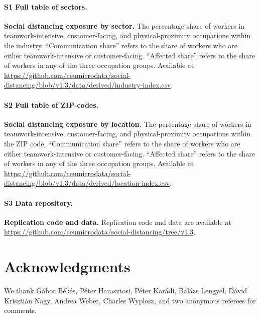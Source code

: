 \paragraph*{S1 Full table of sectors.}
\label{S1_File}
{\bf Social distancing exposure by sector.} The percentage share of workers in teamwork-intensive, customer-facing, and physical-proximity occupations within the industry. ``Communication share'' refers to the share of workers who are either teamwork-intensive or customer-facing. ``Affected share'' refers to the share of workers in any of the three occupation groups. Available at \url{https://github.com/ceumicrodata/social-distancing/blob/v1.3/data/derived/industry-index.csv}.

\paragraph*{S2 Full table of ZIP-codes.}
\label{S2_File}
{\bf Social distancing exposure by location.} The percentage share of workers in teamwork-intensive, customer-facing, and physical-proximity occupations within the ZIP code. ``Communication share'' refers to the share of workers who are either teamwork-intensive or customer-facing. ``Affected share'' refers to the share of workers in any of the three occupation groups. Available at \url{https://github.com/ceumicrodata/social-distancing/blob/v1.3/data/derived/location-index.csv}.

\paragraph*{S3 Data repository.}
\label{S3_URL}
{\bf Replication code and data.} Replication code and data are available at \url{https://github.com/ceumicrodata/social-distancing/tree/v1.3}.

\section*{Acknowledgments}
We thank Gábor Békés, Péter Harasztosi, Péter Karádi, Balázs Lengyel, Dávid Krisztián Nagy, Andrea Weber, Charles Wyplosz, and two anonymous referees for comments.

\nolinenumbers



